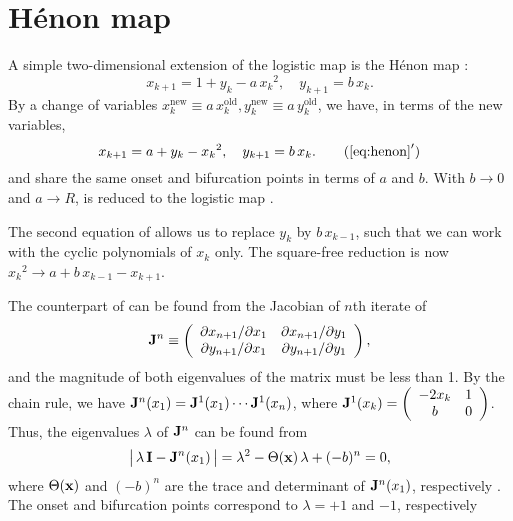 \documentclass{ws-ijbc}
\begin{document}
\section{\label{sec:henon}H\'enon map}




A simple two-dimensional extension of the logistic map
  is the H\'enon map \cite{henon}:
\begin{equation}
  x_{k+1} = 1 + y_k - a \, {x_k}^2, \quad
  y_{k+1} = b \, x_k.
\label{eq:henon}
\end{equation}
%
By a change of variables
  $x_k^\mathrm{new} \equiv a \, x_k^\mathrm{old},
   y_k^\mathrm{new} \equiv a \, y_k^\mathrm{old}$,
we have, in terms of the new variables,
\begin{equation}
  x_{k+1} = a + y_k - {x_k}^2, \quad
  y_{k+1} = b \, x_k.
\tag{$\ref{eq:henon}'$}
\label{eq:henons}
\end{equation}
%
 and  share the
same onset and bifurcation points
in terms of $a$ and $b$.
%
With $b \rightarrow 0$ and $a \rightarrow R$,
 is reduced to the logistic map .


The second equation of 
allows us to replace $y_k$ by $b \, x_{k-1}$,
  such that we can work with the cyclic polynomials of $x_k$ only.
The square-free reduction is now
  ${x_k}^2 \rightarrow a + b \, x_{k-1} - x_{k+1}$.



The counterpart of 
  can be found from the Jacobian of $n$th iterate of 
\[
  \mathbf{J}^n
  \equiv
  \left(
    \begin{array}{ccc}
      \partial x_{n+1}/\partial x_1 & \partial x_{n+1}/\partial y_1 \\
      \partial y_{n+1}/\partial x_1 & \partial y_{n+1}/\partial y_1 \\
    \end{array}
  \right),
\]
and the magnitude of both eigenvalues of the matrix must be less than 1.
By the chain rule, we have
  $\mathbf{J}^n (x_1) = \mathbf{J}^1(x_1) \cdots \mathbf{J}^1(x_n)$,
  where
$\mathbf{J}^1(x_k)
  =
  \left(
    \begin{array}{cc}
      -2 x_k & 1 \\
      b & 0
    \end{array}
  \right)$.
Thus, the eigenvalues $\lambda$ of $\mathbf{J}^n$ can be found from
%
\begin{equation}
\big|\, \lambda \, \mathbf{I} - \mathbf{J}^n(x_1) \,\big|
  = \lambda^2 - \Theta(\mathbf{x}) \,\lambda +(-b)^n = 0,
\label{eq:henonder}
\end{equation}
%
where $\Theta(\mathbf{x})$ and $(-b)^n$
  are the trace and determinant of $\mathbf{J}^n(x_1)$,
  respectively \cite{hitzl}.
The onset and bifurcation points
  correspond to $\lambda = +1$ and $-1$, respectively
\end{document}
